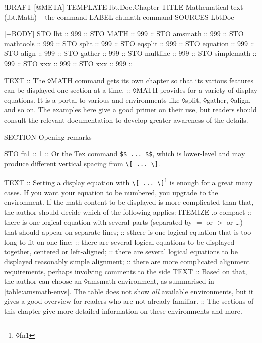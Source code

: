 \begin{lbt}
  !DRAFT
  [@META]
    TEMPLATE lbt.Doc.Chapter
    TITLE Mathematical text \textsf{(lbt.Math)} -- the  command
    LABEL ch.math-command
    SOURCES LbtDoc

  [+BODY]
    STO lbt :: 999 :: \lbtlogo{}
    STO MATH :: 999 :: 
    STO amsmath :: 999 :: 
    STO mathtools :: 999 :: 
    STO split :: 999 :: 
    STO eqsplit :: 999 :: 
    STO equation :: 999 :: 
    STO align :: 999 :: 
    STO gather :: 999 :: 
    STO multline :: 999 :: 
    STO simplemath :: 999 :: 
    STO xxx :: 999 :: 
    STO xxx :: 999 :: 

    TEXT
    :: The ◊MATH command gets its own chapter so that its various features can be displayed one section at a time.
    :: ◊MATH provides for a variety of display equations. It is a portal to various  and  environments like ◊split, ◊gather, ◊align, and so on. The examples here give a good primer on their use, but readers should consult the relevant documentation to develop greater awareness of the details.

    SECTION Opening remarks

    STO fn1 :: 1 :: Or the Tex command \Verb|$$ ... $$|, which is lower-level and may produce different vertical spacing from \Verb|\[ ... \]|.

    TEXT
    :: Setting a display equation with \Verb|\[ ... \]|\footnote{◊fn1} is enough for a great many cases. If you want your equation to be numbered, you upgrade to the  environment. If the math content to be displayed is more complicated than that, the author should decide which of the following applies:
    ITEMIZE .o compact
    :: there is one logical equation with several parts (separated by $=$ or $>$ or \dots) that should appear on separate lines;
    :: sthere is one logical equation that is too long to fit on one line;
    :: there are several logical equations to be displayed together, centered or left-aligned;
    :: there are several logical equations to be displayed reasonably simple alignment;
    :: there are more complicated alignment requirements, perhaps involving comments to the side
    TEXT
    :: Based on that, the author can choose an ◊amsmath environment, as summarised in \cref{table:amsmath-envs}. The table does not show \emph{all} available environments, but it gives a good overview for readers who are not already familiar.
    :: The sections of this chapter give more detailed information on these environments and more.


\end{lbt}
